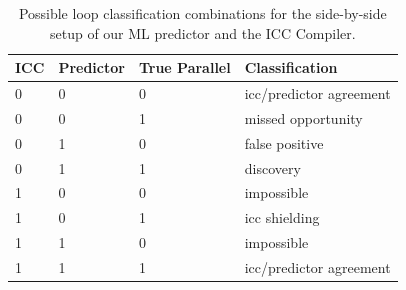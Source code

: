 \begin{table}
  \tabulinesep=2pt
  \caption{Possible loop classification combinations for the side-by-side setup of our ML predictor and the ICC Compiler.}
  \begin{minipage}{\columnwidth}
  \begin{center}
    \begin{tabu}{M{0.7cm}M{1.4cm}M{1.4cm}M{3.4cm}}
      \hline
      \rowfont{\bfseries}
      ICC & Predictor & True Parallel & Classification\\%
       & 0 & 0 & icc/predictor agreement\\
      0 & 0 & 1 & missed opportunity\\
      0 & 1 & 0 & false positive\\
      0 & 1 & 1 & discovery\\
      1 & 0 & 0 & impossible\\
      1 & 0 & 1 & icc shielding\\
      1 & 1 & 0 & impossible\\
      1 & 1 & 1 & icc/predictor agreement\\\hline  
    \end{tabu}
  \end{center}
  \end{minipage}
  \label{tab:combinations_table}
\end{table}%

